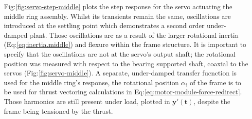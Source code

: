 \par
Fig:\ref{fig:servo-step-middle} plots the step response for the servo actuating the middle ring assembly. Whilst its transients remain the same, oscillations are introduced at the settling point which demonstrates a second order under-damped plant. Those oscillations are as a result of the larger rotational inertia (Eq:\ref{eq:inertia.middle}) and flexure within the frame structure. It is important to specify that the oscillations are not at the servo's output shaft; the rotational position was measured with respect to the bearing supported shaft, coaxial to the servos (Fig:\ref{fig:servo-middle}). A separate, under-damped transfer fucnction is used for the middle ring's response, the rotational position $\alpha_i$ of the frame is to be used for thrust vectoring calculations in Eq:\ref{eq:motor-module-force-redirect}. Those harmonics are still present under load, plotted in {\color{Red}$\mathbf{y'(t)}$}, despite the frame being tensioned by the thrust. 
